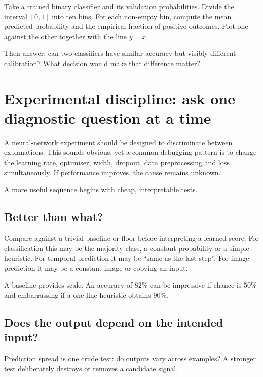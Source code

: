 \begin{optionalexercise}[title={Optional coding --- build a reliability diagram}]
Take a trained binary classifier and its validation probabilities. Divide the interval \([0,1]\) into ten bins. For each non-empty bin, compute the mean predicted probability and the empirical fraction of positive outcomes. Plot one against the other together with the line \(y=x\).

Then answer: can two classifiers have similar accuracy but visibly different calibration? What decision would make that difference matter?
\end{optionalexercise}

\section{Experimental discipline: ask one diagnostic question at a time}

A neural-network experiment should be designed to discriminate between explanations. This sounds obvious, yet a common debugging pattern is to change the learning rate, optimiser, width, dropout, data preprocessing and loss simultaneously. If performance improves, the cause remains unknown.

A more useful sequence begins with cheap, interpretable tests.

\subsection{Better than what?}

Compare against a trivial baseline or floor before interpreting a learned score. For classification this may be the majority class, a constant probability or a simple heuristic. For temporal prediction it may be ``same as the last step''. For image prediction it may be a constant image or copying an input.

A baseline provides scale. An accuracy of \(82\%\) can be impressive if chance is \(50\%\) and embarrassing if a one-line heuristic obtains \(90\%\).

\subsection{Does the output depend on the intended input?}

Prediction spread is one crude test: do outputs vary across examples? A stronger test deliberately destroys or removes a candidate signal.

